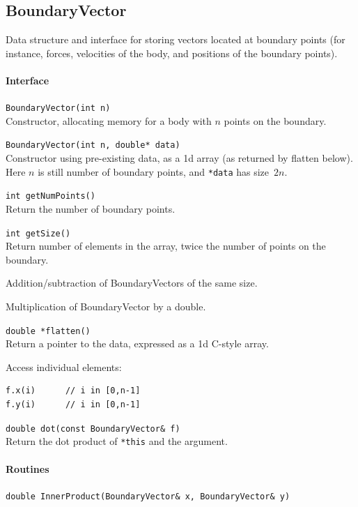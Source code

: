\documentclass[11pt]{article}
\def\fn#1{{\ttfamily\small #1}} %
\let\code\lstinline
\begin{document}
\subsection{BoundaryVector}
Data structure and interface for storing vectors located at boundary points (for instance, forces, velocities of the body, and positions of the boundary points).

\paragraph{Interface}
\begin{description}
	\item \code|BoundaryVector(int n)| \\
	Constructor, allocating memory for a body with $n$ points on the boundary.
	\item \code|BoundaryVector(int n, double* data)| \\
	Constructor using pre-existing data, as a 1d array (as returned by \fn{flatten} below).  Here $n$ is still number of boundary points, and \code|*data| has size~$2n$.
	\item \code|int getNumPoints()|\\
	Return the number of boundary points.
	\item \code|int getSize()| \\
	Return number of elements in the array, twice the number of points on the boundary.
	\item Addition/subtraction of BoundaryVectors of the same size.
	\item Multiplication of BoundaryVector by a double.
	\item \code|double *flatten()|\\
	Return a pointer to the data, expressed as a 1d C-style array.
	\item Access individual elements:
\begin{lstlisting}
f.x(i)		// i in [0,n-1]
f.y(i)		// i in [0,n-1]
\end{lstlisting}
	\item \code|double dot(const BoundaryVector& f)|\\
	Return the dot product of \code|*this| and the argument.
	
\end{description}

\paragraph{Routines}
\begin{description}
	\item \code|double InnerProduct(BoundaryVector& x, BoundaryVector& y)|
\end{description}
\end{document}
